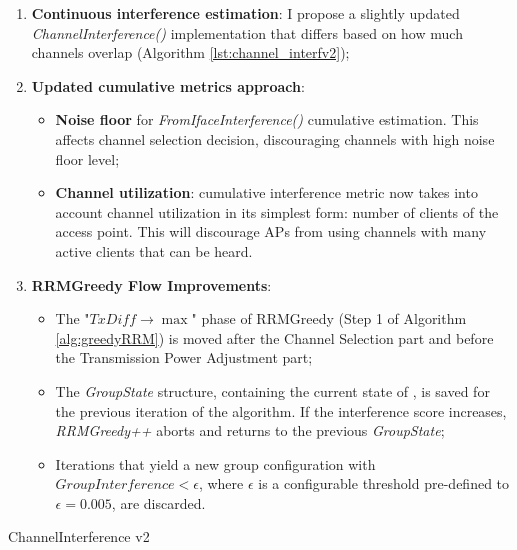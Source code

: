\begin{enumerate}
    \item \textbf{Continuous interference estimation}: I propose a slightly updated \textit{ChannelInterference()} implementation that differs based on how much channels overlap (Algorithm \ref{lst:channel_interfv2});
    \item \textbf{Updated cumulative metrics approach}:
        \begin{itemize}
            \item \textbf{Noise floor} for \textit{FromIfaceInterference()} cumulative estimation. This affects channel selection decision, discouraging channels with high noise floor level;
            \item \textbf{Channel utilization}: cumulative interference metric now takes into account channel utilization in its simplest form: number of clients of the access point. This will discourage APs from using channels with many active clients that can be heard.
        \end{itemize}
    \item \textbf{RRMGreedy Flow Improvements}: 
        \begin{itemize}
            \item The "$TxDiff \rightarrow \max$" phase of RRMGreedy (Step 1 of Algorithm \ref{alg:greedyRRM}) is moved after the Channel Selection part and before the Transmission Power Adjustment part;
            \item The \textit{GroupState} structure, containing the current state of \rrmG, is saved for the previous iteration of the algorithm. If the interference score increases, \textit{RRMGreedy++} aborts and returns to the previous \textit{GroupState};
            \item Iterations that yield a new group configuration with $GroupInterference < \epsilon$, where $\epsilon$ is a configurable threshold pre-defined to $\epsilon = 0.005$, are discarded.
        \end{itemize}
    
\end{enumerate}

\begin{algorithm}[H]
\caption{ChannelInterference v2}
\label{lst:channel_interfv2}
\DontPrintSemicolon %
\end{algorithm}



